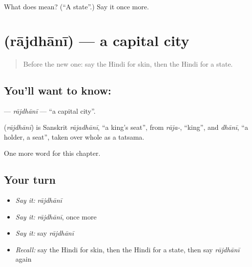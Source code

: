 \begin{tcolorbox}[breakable,colback=teal!4,colframe=teal!35!black,title={Before you move on}]
What does  mean? (\textquotedblleft{}A state\textquotedblright{}.) Say it once more.
\end{tcolorbox}
\section[\texorpdfstring{\hi{राजधानी} (rājdhānī)}{राजधानी (rājdhānī)}]{ (rājdhānī) — a capital city}

\label{lesson:HI-C200-rajdhani}



\begin{quote}
Before the new one: say the Hindi for skin, then the Hindi for a state.
\end{quote}

\subsection*{You'll want to know: }
\textbf{} — \emph{rājdhānī} — \textquotedblleft{}a capital city\textquotedblright{}.

\begin{cousinweb}
\textbf{} (\emph{rājdhānī}) is Sanskrit \emph{rājadhānī}, \textquotedblleft{}a king's seat\textquotedblright{}, from \emph{rāja-}, \textquotedblleft{}king\textquotedblright{}, and \emph{dhānī}, \textquotedblleft{}a holder, a seat\textquotedblright{}, taken over whole as a tatsama.
\end{cousinweb}

\begin{grammarlens}[title={What you've built}]
One more word for this chapter.
\end{grammarlens}

\subsection*{Your turn}
\begin{itemize}
\raggedright
  \item \emph{Say it:} \emph{rājdhānī}
  \item \emph{Say it:} \emph{rājdhānī}, once more
  \item \emph{Say it:} say \emph{rājdhānī}
  \item \emph{Recall:} say the Hindi for skin, then the Hindi for a state, then say \emph{rājdhānī} again
\end{itemize}


